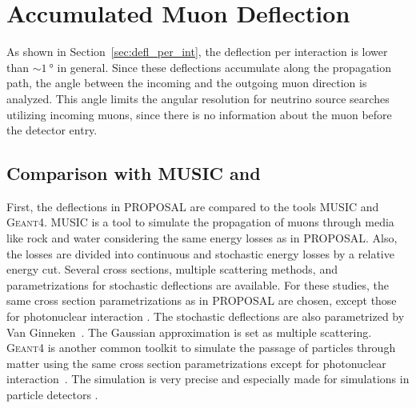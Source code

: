 \section{Accumulated Muon Deflection}\label{sec:accum_defl}

As shown in Section~\ref{sec:defl_per_int}, the deflection per interaction 
is lower than $\sim\SI{1}{\degree}$ in general. Since these deflections accumulate along the 
propagation path, the angle between the incoming and the outgoing 
muon direction is analyzed. This angle limits the angular resolution 
for neutrino source searches utilizing incoming muons, since there is no information 
about the muon before the detector entry.

\subsection{Comparison with MUSIC and }
First, the deflections in PROPOSAL are compared to 
the tools MUSIC and \textsc{Geant4}.
MUSIC is a tool to simulate the propagation of muons 
through media like rock and water considering the same energy losses as in 
PROPOSAL. Also, the losses are divided into continuous and stochastic 
energy losses by a relative energy cut. Several cross sections, multiple scattering 
methods, and parametrizations for stochastic deflections are 
available. For these studies, the same cross section parametrizations 
as in PROPOSAL are chosen, except those for 
photonuclear interaction \cite{nulcint_bugaev_Shlepin, bugaev_1980_defl,bugaev_1981_defl}. The stochastic deflections are also parametrized by 
Van Ginneken~\cite{Van_Ginneken}. 
The Gaussian 
approximation \cite{HIGHLAND_1975} is set as multiple scattering. 
\textsc{Geant4} is another common toolkit to simulate the passage of particles through 
matter using the same cross section parametrizations except for photonuclear interaction~\cite{Borog:1975_inelastic}. The simulation is very precise and especially 
made for simulations in particle detectors \cite{GEANT4_standard, GEANT4}. 

